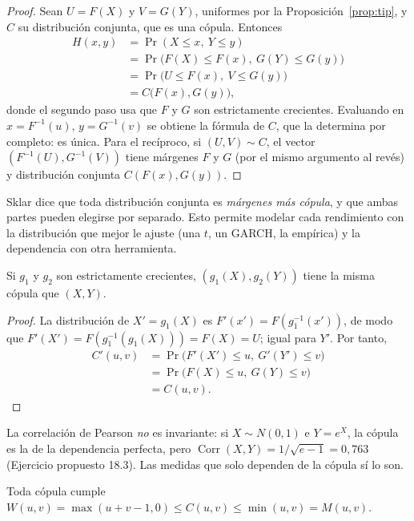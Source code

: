 \begin{proof}
Sean $U=F(X)$ y $V=G(Y)$, uniformes por la Proposición~\ref{prop:tip}, y $C$ su distribución conjunta, que es una cópula.
Entonces
\begin{align*}
  H(x,y) &= \Pr(X\le x,\ Y\le y)\\
         &= \Pr\bigl(F(X)\le F(x),\ G(Y)\le G(y)\bigr)\\
         &= \Pr\bigl(U\le F(x),\ V\le G(y)\bigr)\\
         &= C\bigl(F(x),G(y)\bigr),
\end{align*}
donde el segundo paso usa que $F$ y $G$ son estrictamente crecientes. Evaluando en $x=F^{-1}(u)$, $y=G^{-1}(v)$ se obtiene la
fórmula de $C$, que la determina por completo: es única. Para el recíproco, si $(U,V)\sim C$, el vector
$(F^{-1}(U),G^{-1}(V))$ tiene márgenes $F$ y $G$ (por el mismo argumento al revés) y distribución conjunta $C(F(x),G(y))$.
\end{proof}

Sklar dice que toda distribución conjunta es \emph{márgenes más cópula}, y que ambas partes pueden elegirse por separado.
Esto permite modelar cada rendimiento con la distribución que mejor le ajuste (una $t$, un GARCH, la empírica) y la
dependencia con otra herramienta.

\begin{proposicion}[Invariancia]\label{prop:invariancia}
Si $g_1$ y $g_2$ son estrictamente crecientes, $(g_1(X),g_2(Y))$ tiene la misma cópula que $(X,Y)$.
\end{proposicion}

\begin{proof}
La distribución de $X'=g_1(X)$ es $F'(x')=F(g_1^{-1}(x'))$, de modo que $F'(X')=F(g_1^{-1}(g_1(X)))=F(X)=U$; igual para $Y'$.
Por tanto,
\begin{align*}
  C'(u,v) &= \Pr\bigl(F'(X')\le u,\ G'(Y')\le v\bigr)\\
          &= \Pr\bigl(F(X)\le u,\ G(Y)\le v\bigr)\\
          &= C(u,v).
\end{align*}
\end{proof}

La correlación de Pearson \emph{no} es invariante: si $X\sim N(0,1)$ e $Y=e^X$, la cópula es la de la dependencia perfecta,
pero $\operatorname{Corr}(X,Y)=1/\sqrt{e-1}=0{,}763$ (Ejercicio propuesto 18.3). Las medidas que solo dependen de la cópula sí lo son.

\begin{proposicion}\label{prop:frechet}
Toda cópula cumple $W(u,v)=\max(u+v-1,0)\le C(u,v)\le\min(u,v)=M(u,v)$.
\end{proposicion}

